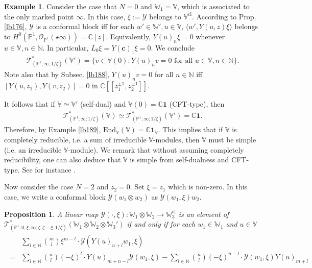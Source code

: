\documentclass[12pt,a4paper,notitlepage]{article}
\theoremstyle{definition}
\newtheorem{eg}[df]{Example}
\theoremstyle{plain}
\newtheorem{pp}[df]{Proposition}
\newcommand{\mc}{\mathcal}
\newcommand{\End}{\mathrm{End}} %
\newcommand{\id}{\mathbf{1}}
\newcommand{\bk}[1]{\langle {#1}\rangle}
\newcommand{\scr}{\mathscr}
\newcommand{\Vbb}{\mathbb V}
\newcommand{\Wbb}{\mathbb W}
\newcommand{\Cbb}{\mathbb C}
\newcommand{\Nbb}{\mathbb N}
\newcommand{\Pbb}{\mathbb P}
\newcommand{\cbf}{\mathbf c}
\newcommand{\cl}{\mathrm{cl}}
\numberwithin{equation}{section}
\begin{document}
\begin{eg}
Consider the case that $N=0$ and  $\Wbb_1=\Vbb$, which is associated to the only marked point $\infty$. In this case, $\xi:=\mc Y$ belongs to $\Vbb^\cl$. According to Prop. \ref{lb176}, $\mc Y$ is a conformal block iff for each $w'\in\Wbb',u\in\Vbb$, $\bk{w',Y(u,z) \xi}$ belongs to $H^0(\Pbb^1,\scr O_{\Pbb^1}(\star\infty))=\Cbb[z]$. Equivalently, $Y(u)_n\xi=0$ whenever $u\in\Vbb,n\in\Nbb$. In particular,  $L_0\xi=Y(\cbf)_1\xi=0$. We conclude
\begin{align}
\scr T_{(\Pbb^1;\infty;1/\zeta)}^*(\Vbb')=\{v\in\Vbb(0):Y(u)_nv=0\text{ for all }u\in\Vbb,n\in\Nbb\}.
\end{align}
Note also that by Subsec. \ref{lb188}, $Y(u)_nv=0$ for all $n\in\Nbb$ iff $[Y(u,z_1),Y(v,z_2)]=0$ in $\Cbb[[z_1^{\pm1},z_2^{\pm1}]]$. 

It follows that if $\Vbb\simeq\Vbb'$ (self-dual) and $\Vbb(0)=\Cbb\id$ (CFT-type), then
\begin{align}
\scr T_{(\Pbb^1;\infty;1/\zeta)}^*(\Vbb)\simeq\scr T_{(\Pbb^1;\infty;1/\zeta)}^*(\Vbb')=\Cbb\id.
\end{align}
Therefore, by Example \ref{lb189}, $\End_\Vbb(\Vbb)=\Cbb\id_\Vbb$. This implies that if $\Vbb$ is completely reducible, i.e. a sum of irreducible $\Vbb$-modules, then $\Vbb$ must be simple (i.e. an irreducible $\Vbb$-module). We remark that without assuming completely reducibility, one can also deduce that $\Vbb$ is simple from self-dualness and CFT-type. See for instance \cite[Prop. 4.6]{CKLW18}.\hfill\qedsymbol
\end{eg}






Now consider the case $N=2$ and $z_2=0$. Set $\xi=z_1$ which is non-zero. In this case, we write a conformal block $\mc Y(w_1\otimes w_2)$ as $\mc Y(w_1,\xi)w_2$.

\begin{pp}
A linear map $\mc Y(\cdot,\xi):\Wbb_1\otimes\Wbb_2\rightarrow\Wbb_3^\cl$ is an element of $\scr T_{(\Pbb^1;0,\xi,\infty;\zeta,\zeta-\xi,1/\zeta)}^*(\Wbb_1\otimes\Wbb_2\otimes\Wbb_3')$ if and only if for each $w_1\in\Wbb_1$ and $u\in\Vbb$
\begin{align}\label{eq257}
\begin{aligned}
&\sum_{l\in\Nbb}{m\choose l}\xi^{m-l}\cdot \mc Y(Y(u)_{n+l}w_1,\xi)\\
=&\sum_{l\in\Nbb}{n\choose l}(-\xi)^l\cdot Y(u)_{m+n-l}\mc Y(w_1,\xi)-\sum_{l\in\Nbb}{n\choose l}(-\xi)^{n-l}\cdot\mc Y(w_1,\xi)Y(u)_{m+l}
\end{aligned}
\end{align}
\end{pp}
\end{document}
